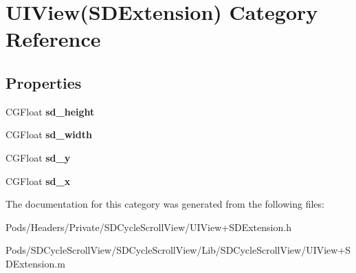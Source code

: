 \hypertarget{category_u_i_view_07_s_d_extension_08}{}\section{U\+I\+View(S\+D\+Extension) Category Reference}
\label{category_u_i_view_07_s_d_extension_08}
\subsection*{Properties}
\begin{DoxyCompactItemize}
\item 
\mbox{\label{category_u_i_view_07_s_d_extension_08_a691f56860e7886189426d89e5d830657}} 
C\+G\+Float {\bfseries sd\+\_\+height}
\item 
\mbox{\label{category_u_i_view_07_s_d_extension_08_a026acce1139f39fb6e5b484e718c72bf}} 
C\+G\+Float {\bfseries sd\+\_\+width}
\item 
\mbox{\label{category_u_i_view_07_s_d_extension_08_ac7f85450ce0d052253766b504b77e2bd}} 
C\+G\+Float {\bfseries sd\+\_\+y}
\item 
\mbox{\label{category_u_i_view_07_s_d_extension_08_a042f7a5d069541e5a16df50b38969f3d}} 
C\+G\+Float {\bfseries sd\+\_\+x}
\end{DoxyCompactItemize}


The documentation for this category was generated from the following files\+:\begin{DoxyCompactItemize}
\item 
Pods/\+Headers/\+Private/\+S\+D\+Cycle\+Scroll\+View/U\+I\+View+\+S\+D\+Extension.\+h\item 
Pods/\+S\+D\+Cycle\+Scroll\+View/\+S\+D\+Cycle\+Scroll\+View/\+Lib/\+S\+D\+Cycle\+Scroll\+View/U\+I\+View+\+S\+D\+Extension.\+m\end{DoxyCompactItemize}
